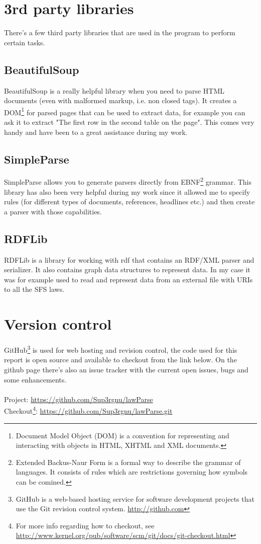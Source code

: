 \section{3rd party libraries}

There's a few third party libraries that are used in the program to perform certain tasks. 

\subsection{BeautifulSoup}

BeautifulSoup is a really helpful library when you need to parse HTML documents (even with malformed markup, i.e. non closed tags). It creates a DOM\footnote{Document Model Object (DOM) is a convention for representing and interacting with objects in HTML, XHTML and XML documents.} for parsed pages that can be used to extract data, for example you can ask it to extract "The first row in the second table on the page". This comes very handy and have been to a great assistance during my work.     

\subsection{SimpleParse}

SimpleParse allows you to generate parsers directly from EBNF\footnote{Extended Backus-Naur Form is a formal way to describe the grammar of languages. It consists of rules which are restrictions governing how symbols can be comined.} grammar. This library has also been very helpful during my work since it allowed me to specify rules (for different types of documents, references, headlines etc.) and then create a parser with those capabilities.  

\subsection{RDFLib}

RDFLib is a library for working with rdf that contains an RDF/XML parser and serializer. It also contains graph data structures to represent data. In my case it was for example used to read and represent data from  an external file with URIs to all the SFS laws.   

\section{Version control}

GitHub\footnote{GitHub is a web-based hosting service for software development
projects that use the Git revision control system. \url{http://github.com}} is
used for web hosting and revision control, the code used for this report is
open source and available to checkout from the link below. On the github page
there's also an issue tracker with the current open issues, bugs and some
enhancements.\\\\
Project: \url{https://github.com/Sup3rgnu/lawParse}\\
Checkout\footnote{For more info regarding how to checkout, see \url{http://www.kernel.org/pub/software/scm/git/docs/git-checkout.html}}: \url{https://github.com/Sup3rgnu/lawParse.git}
